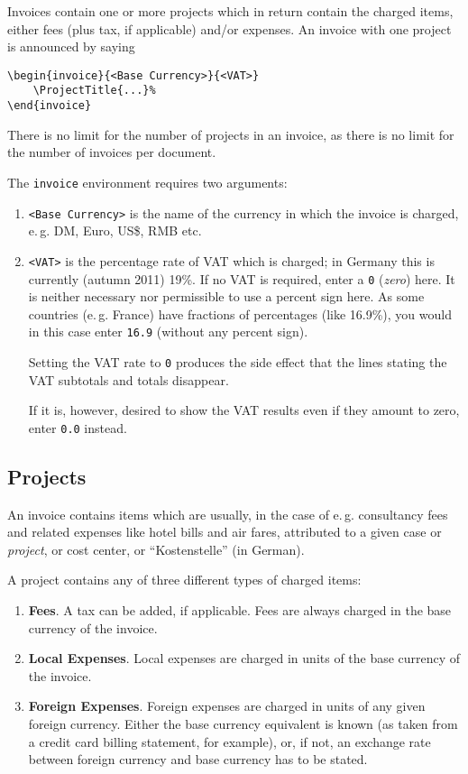 \documentclass[11pt]{ltxdoc}
\begin{document}
Invoices contain one or more projects which in return contain the charged
items, either fees (plus tax, if applicable) and/or expenses. An
invoice with one project is announced by saying 

\begin{verbatim}
\begin{invoice}{<Base Currency>}{<VAT>}
	\ProjectTitle{...}%
\end{invoice}
\end{verbatim}

There is no limit for the number of projects in an invoice, as there
is no limit for the number of invoices per document.

The \texttt{invoice} environment requires two arguments: 
\begin{enumerate}
	\item \texttt{<Base Currency>} is the name of the currency
		in which the invoice is charged, e.\,g. DM, Euro,
		US\$, RMB etc.
	\item \texttt{<VAT>} is the percentage rate of VAT which is charged;
		in Germany this is currently (autumn 2011) 19\%. If
		no VAT is required, enter a \texttt{0}
		(\textit{zero}) here. It is neither necessary nor
		permissible to use a percent sign here. As some
		countries (e.\,g. France) have fractions of
		percentages (like 16.9\%), you would in this case
		enter \verb|16.9| (without any percent sign).

		Setting the VAT rate to \verb-0- produces the side
		effect that the lines stating the VAT subtotals and
		totals disappear.

		If it is, however, desired to show the VAT results
		even if they amount to zero, enter \verb-0.0- instead.
\end{enumerate}


\subsection{Projects}

An invoice contains items which are usually, in the case of e.\,g.
consultancy fees and related expenses like hotel bills and air
fares, attributed to a given case or \textit{project}, or
cost center, or ``Kostenstelle'' (in German).

A project contains any of three different types of charged items:
\begin{enumerate}
	\item \textbf{Fees}. A tax can be added, if applicable. Fees 
		are always charged in the
			base currency
		of the invoice.
	\item \textbf{Local Expenses}. Local expenses are charged in 
		units of the 
			base currency
		of the invoice.
	\item \textbf{Foreign Expenses}. Foreign expenses are charged in 
		units of any given foreign currency. Either the
			base currency
		equivalent is known (as taken from a credit card
		billing statement, for example), or, if not, an
		exchange rate between foreign currency and base
		currency has to be stated.
\end{enumerate}
\end{document}
